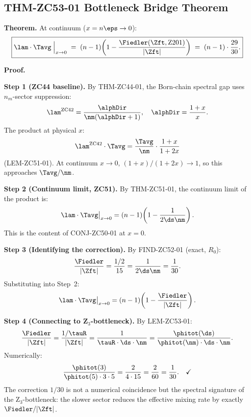 \documentclass[12pt, a4paper]{article}
\begin{document}
\subsection{THM-ZC53-01 \quad Bottleneck Bridge Theorem}
\label{zc53:sec:thm01}


\begin{formalbox}[title={THM-ZC53-01: Bottleneck Bridge Theorem
  ($R_0$, Conditional)}]
\textbf{Theorem.}
At continuum ($x = n\eps \to 0$):
\begin{equation}\label{zc53:eq:bridge}
  \boxed{
  \lam\cdot\Tavg
  \;\Big|_{x\to 0}
  \;=\;
  (n-1)\!\left(1 - \frac{\Fiedler(\Zft,\mathrm{Z201})}{|\Zft|}\right)
  \;=\;
  (n-1)\cdot\frac{29}{30}.
  }
\end{equation}

\textbf{Proof.}

\textbf{Step 1 (ZC44 baseline).}
By THM-ZC44-01, the Born-chain spectral gap uses
$n_m$-sector suppression:
\[
  \lam^{\rm ZC42} = \frac{\alphDir}{\nm(\alphDir+1)},
  \quad \alphDir = \frac{1+x}{x}.
\]
The product at physical $x$:
\[
  \lam^{\rm ZC42}\cdot\Tavg
  = \frac{\Tavg}{\nm}\cdot\frac{1+x}{1+2x}
\]
(LEM-ZC51-01). At continuum $x\to 0$, $(1+x)/(1+2x)\to 1$,
so this approaches $\Tavg/\nm$.

\textbf{Step 2 (Continuum limit, ZC51).}
By THM-ZC51-01, the continuum limit of the product is:
\[
  \lam\cdot\Tavg\big|_{x\to 0}
  = (n-1)\!\left(1 - \frac{1}{2\ds\nm}\right).
\]
This is the content of CONJ-ZC50-01 at $x=0$.

\textbf{Step 3 (Identifying the correction).}
By FIND-ZC52-01 (exact, $R_0$):
\[
  \frac{\Fiedler}{|\Zft|} = \frac{1/2}{15} = \frac{1}{2\ds\nm} = \frac{1}{30}.
\]
Substituting into Step~2:
\[
  \lam\cdot\Tavg\big|_{x\to 0}
  = (n-1)\!\left(1 - \frac{\Fiedler}{|\Zft|}\right).
\]

\textbf{Step 4 (Connecting to Z$_3$-bottleneck).}
By LEM-ZC53-01:
\[
  \frac{\Fiedler}{|\Zft|}
  = \frac{1/\tauR}{|\Zft|}
  = \frac{1}{\tauR\cdot\ds\cdot\nm}
  = \frac{\phitot(\ds)}{\phitot(\nm)\cdot\ds\cdot\nm}.
\]
Numerically:
\[
  \frac{\phitot(3)}{\phitot(5)\cdot 3\cdot 5}
  = \frac{2}{4\cdot 15} = \frac{2}{60} = \frac{1}{30}. \quad\checkmark
\]
The correction $1/30$ is not a numerical coincidence but the
spectral signature of the Z$_3$-bottleneck: the slower sector
reduces the effective mixing rate by exactly $\Fiedler/|\Zft|$.


\end{formalbox}
\end{document}

